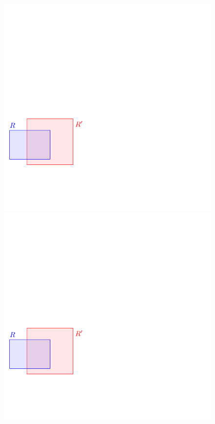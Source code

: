 \documentclass[12pt]{article}%
\begin{document}
\begin{figure}
    \phantom{}\hfill%
    \includegraphics[page=1]{figs/expand}%
    \hfill%
    \includegraphics[page=2]{figs/expand}%
    \hfill\phantom{}%
    \caption{}
\end{figure}
\end{document}
